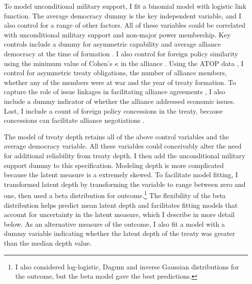 \documentclass[12pt]{article}
\begin{document}
To model unconditional military support, I fit a binomial model with logistic link function. 
The average democracy dummy is the key independent variable, and I also control for a range of other factors.
All of these variables could be correlated with unconditional military support and non-major power membership. 
Key controls include a dummy for asymmetric capability \citep{Mattes2012} and average alliance democracy at the time of formation \citep{Chibaetal2015}. 
I also control for foreign policy similarity \citep{Benson2012} using the minimum value of Cohen's $\kappa$ in the alliance \citep{Hage2011}.
Using the ATOP data \citep{Leedsetal2002}, I control for asymmetric treaty obligations, the number of alliance members, whether any of the members were at war and the year of treaty formation. 
To capture the role of issue linkages in facilitating alliance agreements \citep{Poast2012, Poast2013}, I also include a dummy indicator of whether the alliance addressed economic issues.  
Last, I include a count of foreign policy concessions in the treaty, because concessions can facilitate alliance negotiations \citep{Johnson2015}. 


The model of treaty depth retains all of the above control variables and the average democracy variable. 
All these variables could conceivably alter the need for additional reliability from treaty depth. 
I then add the unconditional military support dummy to this specification. 
Modeling depth is more complicated because the latent measure is a extremely skewed.
To facilitate model fitting, I transformed latent depth by transforming the variable to range between zero and one, then used a beta distribution for outcome.\footnote{I also considered log-logistic, Dagum and inverse Gaussian distributions for the outcome, but the beta model gave the best predictions.}
The flexibility of the beta distribution helps predict mean latent depth and facilitates fitting models that account for uncertainty in the latent measure, which I describe in more detail below. 
As an alternative measure of the outcome, I also fit a model with a dummy variable indicating whether the latent depth of the treaty was greater than the median depth value. 
\end{document}

